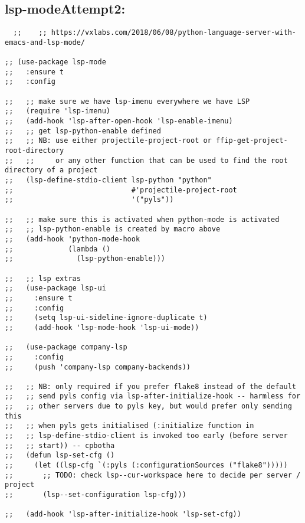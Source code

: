 \documentclass[11pt]{article}
\begin{document}
\subsection{lsp-modeAttempt2:}
\label{sec:org035034a}

\begin{verbatim}
  ;;    ;; https://vxlabs.com/2018/06/08/python-language-server-with-emacs-and-lsp-mode/

;; (use-package lsp-mode
;;   :ensure t
;;   :config

;;   ;; make sure we have lsp-imenu everywhere we have LSP
;;   (require 'lsp-imenu)
;;   (add-hook 'lsp-after-open-hook 'lsp-enable-imenu)  
;;   ;; get lsp-python-enable defined
;;   ;; NB: use either projectile-project-root or ffip-get-project-root-directory
;;   ;;     or any other function that can be used to find the root directory of a project
;;   (lsp-define-stdio-client lsp-python "python"
;;                            #'projectile-project-root
;;                            '("pyls"))

;;   ;; make sure this is activated when python-mode is activated
;;   ;; lsp-python-enable is created by macro above 
;;   (add-hook 'python-mode-hook
;;             (lambda ()
;;               (lsp-python-enable)))

;;   ;; lsp extras
;;   (use-package lsp-ui
;;     :ensure t
;;     :config
;;     (setq lsp-ui-sideline-ignore-duplicate t)
;;     (add-hook 'lsp-mode-hook 'lsp-ui-mode))

;;   (use-package company-lsp
;;     :config
;;     (push 'company-lsp company-backends))

;;   ;; NB: only required if you prefer flake8 instead of the default
;;   ;; send pyls config via lsp-after-initialize-hook -- harmless for
;;   ;; other servers due to pyls key, but would prefer only sending this
;;   ;; when pyls gets initialised (:initialize function in
;;   ;; lsp-define-stdio-client is invoked too early (before server
;;   ;; start)) -- cpbotha
;;   (defun lsp-set-cfg ()
;;     (let ((lsp-cfg `(:pyls (:configurationSources ("flake8")))))
;;       ;; TODO: check lsp--cur-workspace here to decide per server / project
;;       (lsp--set-configuration lsp-cfg)))

;;   (add-hook 'lsp-after-initialize-hook 'lsp-set-cfg))


\end{verbatim}
\end{document}

